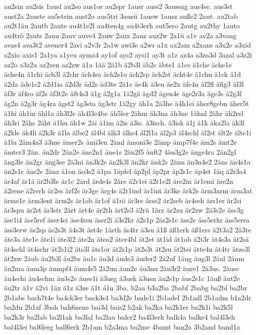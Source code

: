 {au2sin
au2sis
1ausl
au2so
aus1or
au2spr
1ausr
auss2
3aussag
aus4se.
aus3st
aust2a
2auste
au5stein
aust2o
aus5tri
3ausü
1ausw
1ausz
auße2
2aut.
au2tab
au2t1äu
2autb
2aute
au4t1e2l
au4ten4g
au4t3erh
aut5ero
2autg
au2thy
1auto
au4trö
2auts
2auu
2auv
auve4
2auw
2aux
2auz
auz2w
2a1ü
a1v
av2a
a3vang
avas4
ava3t2
avener4
2avi
a2v3r
2a1w
awi3e
a2wr
a1x
ax2am
a2xans
a3x2e
a3xid
a2xio
axis1
2a1ya
a1yeu
ayma4
ay1of
ays2
aysi1
ay3t
a1z
az4a
a3za3d
3azal
a3z2i
az2o
a3z2u
az2zen
az2zw
ä1a
1ää
2ä1b
ä2b3l
äb2s
äbte1
ä1ce
ä1che
äche1e
äche4n
ä1chi
äch3l
ä2chr
äch4sa
äch2s1o
äch2sp
äch2st
ächt4e
ä1chu
ä1ck
ä1d
ä2da
äde1s2
ä2d1ia
ä2d3r
äd2s
äd3te
2ä1e
äe4k
ä3eu
äe2x
äfe4n
äf2fl
äfig3
äf3l
äf3r
äf4ro
äf2s
äf3t2e
äft4s3
ä1g
ä2g1a
1ä2gä
ägd2
ägen4e
äge2r3a
äge3s
ä2g3l
äg2n
ä2g3r
äg4ra
ägst2
äg3sta
äg3str
1ä2gy
äh1a
2ä3he
ä4h1ei
äher8gebn
äher5t
ä1hi
äh1in
ähl1a
äh3l2e
äh4l3e4be
äh5ler
2ähm
äh3na
äh3ne
1ähnl
2ähr
äh2rel
äh3ri
2ähs
2äht
ä1hu
äh1w
2äi
ä1im
ä2is
ä3is.
ä3isch.
ä3isk
ä1j
ä1k
äka2la
äk3l
ä2kle
äk4li
ä2k3r
ä1la
älbe2
äl4bl
älk3
älks4
äl2l1a
äl2p3
äl4schl
äl2st
ält2e
älte1i
ä1lu
2äm4a3
ä3me
ämer2s
ämi3en
2äml
ämoni3e
2ämp
ämp7f4e
äm2s
ämt2e
ämter3
2än.
än2dr
2än2e
äne2n1
äne1s
2än2f5
änft2
4än3g2e
änge4ra
2än2gl
äng3le
än2gr
äng3se
2ä3ni
än3k2e
än2k3l
än2kr
änk2s
2änn
än3n4e2
2äns
än4s1a
än2s1c
äns2e
2änz
ä1on
äo3s2
ä1pa
1äpfel
äp2pl
äp2pr
äp2s1c
äp4st
1äq
ä2r3a4
är4af
är1ä
är2b3le
är1c
2ärd
ärde4s
2äre
ä2r1ei
ä2r1e2l
äre2m
är1emi
äre2n
ä2rene
ä2rerh
är2es
ärf2s
är3ge
ärg4s
ä2r1ind
är1int
är3ke
ärk2s
ärm3arm
ärm3at
ärme1e
ärm3ent
ärm2s
är1ob
är1of
ä1rö
är3re
ärse2
är2seb
är4seh
ärs1er
är2si
är3spu
är2st
är3str
2ärt
ärt4e
är2th
ärt2s3
ä2rü
1ärz
är2zu
är2zw
2ä3s2e
äse3g
äse1i4
äse5ref
äser4ei
äse4ren
äser2i
ä3s2kr
ä2s1p
2äs2s1c
äss2e
äss5erkr
äss5ersa
äss3erw
äs2sp
äs2s3t
ä4s3t
äst4e
1ästh
äs4tr
ä3su
ä1ß
äß1erk
äß1ers
ä2t3a2
2ä3te
äte3a
äte1e
äte1i
äte3l2
äte2n
äteo2
äter4bl
ät2et
ät1id
ät1ob
ä2t3r
ät4s3a
ät2sä
ät4schl
ät4schr
ät2s1i2
äts3l
äts1or
ät2s1p
ät2s3t
ät2su
ät2tei
ätte4n
ät4tr
ätze3l
ät2zw
2äub
äu2b3l
äu2br
äu1c
äu3d
äude3
äuder2
2ä2uf
1äug
äug3l
2äul
2äum
äu2ma
äum3p
äumpf4
äum4s5
2ä2un
äun2e
äu3nu
2äu3r2
äure1
2ä3us.
2äusc
äu4schi
äu4schm
äu3s2e
äuse1i
ä3usg
ä3usk
ä3usn
äu2s1p
äus2s1c
1äuß
äut2e
äu2tr
ä1v
ä2vi
1äx
ä1z
ä3ze
â1t
á1n
3ba.
b2aa
b3a2ba
2babf
2babg
ba2bl
ba2br
2b1abs
bach7t4e
ba4ck3er
back3s4
ba3d2e
bade1i
2b1adel
2b1adl
2b1adm
b1a2dr
ba2du
2b1af
3bah
bah6nene
bai3d
bais2
b2ak
ba2ka
ba2k1er
ba2k1i
ba2k5l
ba2k3r
ba2lab
ba2l1ak
ba3lal
ba2lau
baler2
ba4l3erk
balk4a
balke4
bal4l3eh
bal4l3ei
bal6lerg
ball6erk
2b1am
b2a3ma
ba2me
4bamt
ban2a
3b2and
band1a
}
